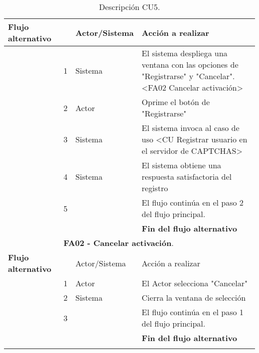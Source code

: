 \documentclass[12pt,oneside,onecolumn,openany]{report}
\begin{document}
\begin{longtable}[H]{| p{} | p{} |p{4cm}|p{5cm}|}
     \hline
     \textbf{Flujo alternativo} & & Actor/Sistema & Acción a realizar\\
     \hline
     & 1 & Sistema & El sistema despliega una ventana con las opciones de "Registrarse" y "Cancelar". <FA02 Cancelar activación>\\
     \hline
     & 2 & Actor & Oprime el botón de "Registrarse"\\
     \hline
     & 3 & Sistema & El sistema invoca al caso de uso <CU Registrar usuario en el servidor de CAPTCHAS>\\
     \hline
     & 4 & Sistema & El sistema obtiene una respuesta satisfactoria del registro\\
     \hline
     & 5 &  & El flujo continúa en el paso 2 del flujo principal.\\
     \hline
     &  & & \textbf{Fin del flujo alternativo}\\
     \hline
     & \multicolumn{3}{|l|}{\textbf{FA02 - Cancelar activación}.}\\
     \hline
     \textbf{Flujo alternativo} & & Actor/Sistema & Acción a realizar\\
     \hline
     & 1 & Actor & El Actor selecciona "Cancelar"\\
     \hline
     & 2 & Sistema & Cierra la ventana de selección\\
     \hline
     & 3 &  & El flujo continúa en el paso 1 del flujo principal.\\
     \hline
     &  & & \textbf{Fin del flujo alternativo}\\
    \caption{Descripción CU5.}
    \label{tabla:CU5}
\end{longtable}


\pagebreak
\end{document}
